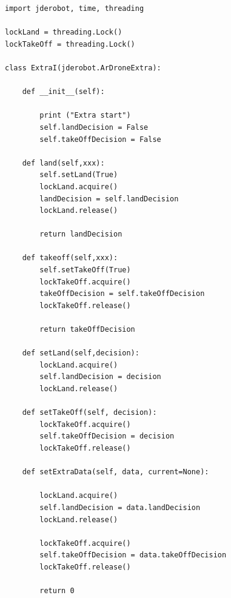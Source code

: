 \begin{lstlisting}[frame=single]
import jderobot, time, threading

lockLand = threading.Lock()
lockTakeOff = threading.Lock()

class ExtraI(jderobot.ArDroneExtra):

    def __init__(self):

        print ("Extra start")
        self.landDecision = False
        self.takeOffDecision = False

    def land(self,xxx):
        self.setLand(True)
        lockLand.acquire()
        landDecision = self.landDecision
        lockLand.release()

        return landDecision

    def takeoff(self,xxx):
        self.setTakeOff(True)
        lockTakeOff.acquire()
        takeOffDecision = self.takeOffDecision
        lockTakeOff.release()

        return takeOffDecision

    def setLand(self,decision):
        lockLand.acquire()
        self.landDecision = decision
        lockLand.release()

    def setTakeOff(self, decision):
        lockTakeOff.acquire()
        self.takeOffDecision = decision
        lockTakeOff.release()

    def setExtraData(self, data, current=None):

        lockLand.acquire()
        self.landDecision = data.landDecision
        lockLand.release()

        lockTakeOff.acquire()
        self.takeOffDecision = data.takeOffDecision
        lockTakeOff.release()

        return 0

\end{lstlisting}  
